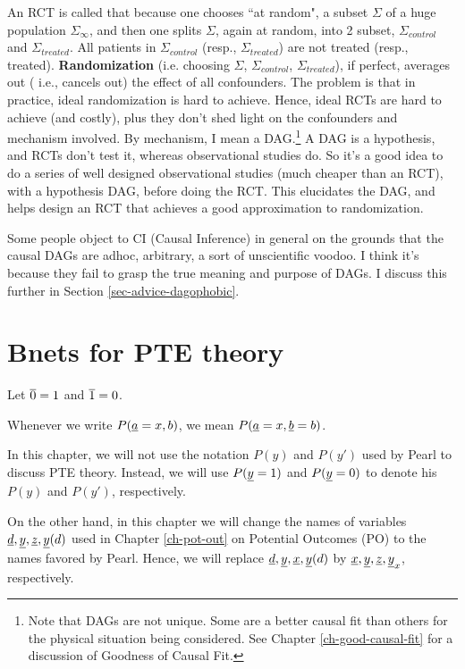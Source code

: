 An RCT is called that 
because one chooses
``at random", a subset $\Sigma$
of a huge population
$\Sigma_\infty$,
and then one 
splits $\Sigma$,
again at random, into 2
subset, $\Sigma_{control}$ and $\Sigma_{treated}$.
All patients in 
$\Sigma_{control}$ (resp., 
$\Sigma_{treated}$) are not treated
(resp., treated).
{\bf Randomization}
(i.e. choosing $\Sigma$,
$\Sigma_{control}$, $\Sigma_{treated}$), if perfect, averages out (
i.e., cancels out) 
the effect of all confounders. The problem is that in practice, ideal randomization is hard to achieve. Hence, ideal RCTs are hard to achieve (and costly), plus they don't shed light on the confounders and mechanism involved.
By  mechanism, I mean a DAG.\footnote{Note
that DAGs are not unique. Some are a better causal fit than others
for the 
physical
situation
being considered. See Chapter \ref{ch-good-causal-fit}
for a discussion of Goodness of Causal Fit.}
 A DAG is a hypothesis, and RCTs don't test it, whereas observational studies do.
So it's a good
idea to do a series of well designed observational studies (much cheaper than an RCT), with a hypothesis DAG, before doing the RCT. This
elucidates the DAG, 
and helps design an RCT that achieves a good approximation to randomization.

Some people object to  CI (Causal Inference) in general on the
grounds that the causal DAGs
 are adhoc, arbitrary, a
sort of unscientific voodoo. I think it’s because they fail to grasp the
true meaning
and purpose of DAGs.
I discuss this further
in Section \ref{sec-advice-dagophobic}.






\section{Bnets for PTE theory}
\quad

Let $\overline{0}=1$ and $\overline{1}=0$.

Whenever we write $P({\underline{a}}=x, b)$,
we mean $P({\underline{a}}=x, {\underline{b}}=b)$.

In this chapter, we will
not use the notation
$P(y)$ and $P(y')$
used by Pearl to
discuss PTE theory.
Instead, we will
use $P({\underline{y}}=1)$ and
$P({\underline{y}}=0)$
to denote his
$P(y)$ and $P(y')$, respectively.


On the other hand,
in this chapter
we will change the names
of variables ${\underline{d}}, {\underline{y}}, {\underline{z}}, {\underline{y}}(d)$
used
in Chapter \ref{ch-pot-out} on Potential
Outcomes (PO)
to the names favored by Pearl.
Hence, we will replace
${\underline{d}}, {\underline{y}}, {\underline{x}}, {\underline{y}}(d)$
by
${\underline{x}}, {\underline{y}}, {\underline{z}}, {\underline{y}}_x$,
respectively.



